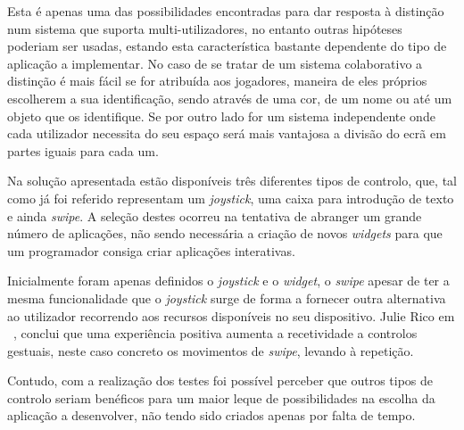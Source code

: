 Esta é apenas uma das possibilidades encontradas para dar resposta à distinção num sistema que suporta multi-utilizadores, no entanto outras hipóteses poderiam ser usadas, estando esta característica bastante dependente do tipo de aplicação a implementar. No caso de se tratar de um sistema colaborativo a distinção é mais fácil se for atribuída aos jogadores, maneira de eles próprios escolherem a sua identificação, sendo através de uma cor, de um nome ou até um objeto que os identifique. Se por outro lado for um sistema independente onde cada utilizador necessita do seu espaço será mais vantajosa a divisão do ecrã em partes iguais para cada um.

Na solução apresentada estão disponíveis três diferentes tipos de controlo, que, tal como já foi referido representam um \textit{joystick}, uma caixa para introdução de texto e ainda \textit{swipe}. A seleção destes ocorreu na tentativa de abranger um grande número de aplicações, não sendo necessária a criação de novos \textit{widgets} para que um programador consiga criar aplicações interativas. 

Inicialmente foram apenas definidos o \textit{joystick} e o \textit{widget}, o \textit{swipe} apesar de ter a mesma funcionalidade que o \textit{joystick} surge de forma a fornecer outra alternativa ao utilizador recorrendo aos recursos disponíveis no seu dispositivo. 
Julie Rico em ~\cite{Rico2010}, conclui que uma experiência positiva aumenta a recetividade a controlos gestuais, neste caso concreto os movimentos de \textit{swipe}, levando à repetição.  

Contudo, com a realização dos testes foi possível perceber que outros tipos de controlo seriam benéficos para um maior leque de possibilidades na escolha da aplicação a desenvolver, não tendo sido criados apenas por falta de tempo.








